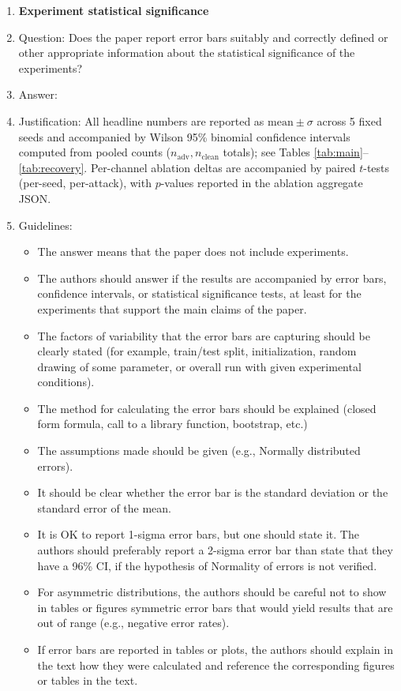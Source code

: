 \begin{enumerate}
\item {\bf Experiment statistical significance}
    \item[] Question: Does the paper report error bars suitably and correctly defined or other appropriate information about the statistical significance of the experiments?
    \item[] Answer: \answerYes{}
    \item[] Justification: All headline numbers are reported as $\text{mean} \pm \sigma$ across 5 fixed seeds and accompanied by Wilson 95\% binomial confidence intervals computed from pooled counts ($n_\text{adv}, n_\text{clean}$ totals); see Tables \ref{tab:main}--\ref{tab:recovery}. Per-channel ablation deltas are accompanied by paired $t$-tests (per-seed, per-attack), with $p$-values reported in the ablation aggregate JSON.
    \item[] Guidelines:
    \begin{itemize}
        \item The answer \answerNA{} means that the paper does not include experiments.
        \item The authors should answer \answerYes{} if the results are accompanied by error bars, confidence intervals, or statistical significance tests, at least for the experiments that support the main claims of the paper.
        \item The factors of variability that the error bars are capturing should be clearly stated (for example, train/test split, initialization, random drawing of some parameter, or overall run with given experimental conditions).
        \item The method for calculating the error bars should be explained (closed form formula, call to a library function, bootstrap, etc.)
        \item The assumptions made should be given (e.g., Normally distributed errors).
        \item It should be clear whether the error bar is the standard deviation or the standard error of the mean.
        \item It is OK to report 1-sigma error bars, but one should state it. The authors should preferably report a 2-sigma error bar than state that they have a 96\% CI, if the hypothesis of Normality of errors is not verified.
        \item For asymmetric distributions, the authors should be careful not to show in tables or figures symmetric error bars that would yield results that are out of range (e.g., negative error rates).
        \item If error bars are reported in tables or plots, the authors should explain in the text how they were calculated and reference the corresponding figures or tables in the text.
    \end{itemize}


\end{enumerate}
